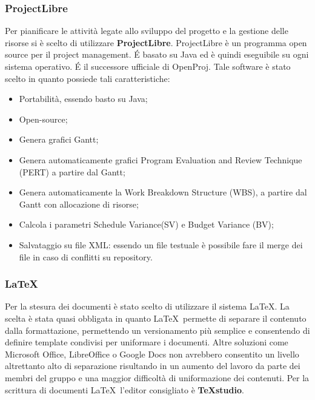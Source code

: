 \documentclass[../NormeDiProgetto.tex]{subfiles}
\begin{document}
			\subsubsection{ProjectLibre}
				Per pianificare le attività legate allo sviluppo del progetto e la gestione delle risorse si è scelto di utilizzare \textbf{ProjectLibre}.
				ProjectLibre è un programma open source per il project management. É basato su Java ed è quindi eseguibile su ogni sistema operativo. É il successore ufficiale di OpenProj. Tale software è stato scelto in quanto possiede tali caratteristiche:
				\begin{itemize}
					\item Portabilità, essendo basto su Java;
					\item Open-source;
					\item Genera grafici Gantt;
					\item Genera automaticamente grafici Program Evaluation and Review Technique (PERT\ped{G}) a partire dal Gantt;
					\item Genera automaticamente la Work Breakdown Structure (WBS), a partire dal Gantt con allocazione di risorse;
					\item Calcola i parametri Schedule Variance\ped{G}(SV) e Budget Variance (BV);
					\item Salvataggio su file XML: essendo un file testuale è possibile fare il merge dei file in caso di conflitti su repository. 
				\end{itemize}
			\subsubsection{\LaTeX}
				Per la stesura dei documenti è stato scelto di utilizzare il sistema \LaTeX.
				La scelta è stata quasi obbligata in quanto \LaTeX\ permette di separare il contenuto dalla formattazione, permettendo un versionamento più semplice e consentendo di definire template condivisi per uniformare i documenti. Altre soluzioni come Microsoft Office, LibreOffice o Google Docs non avrebbero consentito un livello altrettanto alto di separazione risultando in un aumento del lavoro da parte dei membri del gruppo e una maggior difficoltà di uniformazione dei contenuti.
				Per la scrittura di documenti \LaTeX\ l’editor consigliato è \textbf{TeXstudio}.
				
\end{document}
